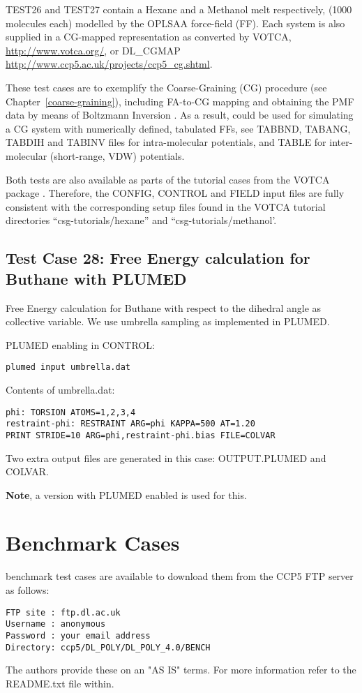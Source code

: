 TEST26 and TEST27 contain a Hexane and a Methanol melt respectively,
(1000 molecules each) modelled by the OPLSAA force-field (FF).
Each system is also supplied in a CG-mapped representation as converted
by VOTCA, \href{http://www.votca.org/}{http://www.votca.org/},
or DL\_CGMAP \href{http://www.ccp5.ac.uk/projects/ccp5\_cg.shtml}{http://www.ccp5.ac.uk/projects/ccp5\_cg.shtml}.

These test cases are to exemplify the Coarse-Graining (CG) procedure
(see Chapter~\ref{coarse-graining}), including FA-to-CG mapping and
obtaining the PMF data by means of Boltzmann Inversion \cite{reith-03a}.
As a result, \D could be used for simulating a CG system with numerically
defined, tabulated FFs, see TABBND, TABANG, TABDIH and TABINV files for
intra-molecular potentials, and TABLE for inter-molecular (short-range, VDW)
potentials.

Both tests are also available as parts of the tutorial cases from the
VOTCA package \cite{ruhle-09a}.  Therefore, the CONFIG, CONTROL and FIELD
input files are fully consistent with the corresponding setup files found
in the VOTCA tutorial directories ``csg-tutorials/hexane'' and ``csg-tutorials/methanol'.

\subsection{Test Case 28: Free Energy calculation for Buthane with PLUMED}

Free Energy calculation for Buthane with respect to the dihedral angle as
collective variable.  We use umbrella sampling as implemented in PLUMED.

PLUMED enabling in CONTROL:
\begin{lstlisting}
plumed input umbrella.dat
\end{lstlisting}

Contents of umbrella.dat:
\begin{lstlisting}
phi: TORSION ATOMS=1,2,3,4
restraint-phi: RESTRAINT ARG=phi KAPPA=500 AT=1.20
PRINT STRIDE=10 ARG=phi,restraint-phi.bias FILE=COLVAR
\end{lstlisting}

Two extra output files are generated in this case: OUTPUT.PLUMED and COLVAR.

{\bf Note}, a \D version with PLUMED enabled is used for this.

\section{Benchmark Cases}

\D benchmark test cases are available to download them from the CCP5 FTP
server as follows:

\begin{lstlisting}
FTP site : ftp.dl.ac.uk
Username : anonymous
Password : your email address
Directory: ccp5/DL_POLY/DL_POLY_4.0/BENCH
\end{lstlisting}

The \D authors provide these on an "AS IS" terms.  For more information
refer to the README.txt file within.

